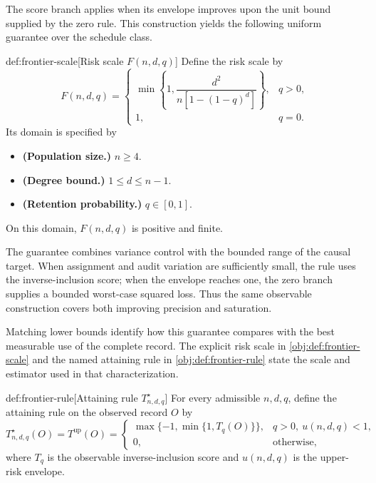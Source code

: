 The score branch applies when its envelope improves upon the unit bound supplied by the zero rule. This construction yields the following uniform guarantee over the schedule class.

\begin{definitionv}{def:frontier-scale}[Risk scale $F(n,d,q)$]
Define the risk scale by
\[
F(n,d,q)=
\begin{cases}
\min\left\{1,\dfrac{d^2}{n[1-(1-q)^d]}\right\},&q>0,\\
1,&q=0.
\end{cases}
\]
Its domain is specified by
\begin{itemize}
\item \textbf{(Population size.)} \(n\ge4\).
\item \textbf{(Degree bound.)} \(1\le d\le n-1\).
\item \textbf{(Retention probability.)} \(q\in[0,1]\).
\end{itemize}
On this domain, \(F(n,d,q)\) is positive and finite.
\end{definitionv}

The guarantee combines variance control with the bounded range of the causal target. When assignment and audit variation are sufficiently small, the rule uses the inverse-inclusion score; when the envelope reaches one, the zero branch supplies a bounded worst-case squared loss. Thus the same observable construction covers both improving precision and saturation.

Matching lower bounds identify how this guarantee compares with the best measurable use of the complete record. The explicit risk scale  in \cref{obj:def:frontier-scale} and the named attaining rule  in \cref{obj:def:frontier-rule} state the scale and estimator used in that characterization.

\begin{definitionv}{def:frontier-rule}[Attaining rule $T^\star_{n,d,q}$]
For every admissible \(n,d,q\), define the attaining rule on the observed record \(O\) by
\[
T^\star_{n,d,q}(O)=T^{\mathrm{up}}(O)=
\begin{cases}
\max\{-1,\min\{1,T_q(O)\}\},&q>0,\ u(n,d,q)<1,\\
0,&\text{otherwise},
\end{cases}
\]
where \(T_q\) is the observable inverse-inclusion score and \(u(n,d,q)\) is the upper-risk envelope.
\end{definitionv}


